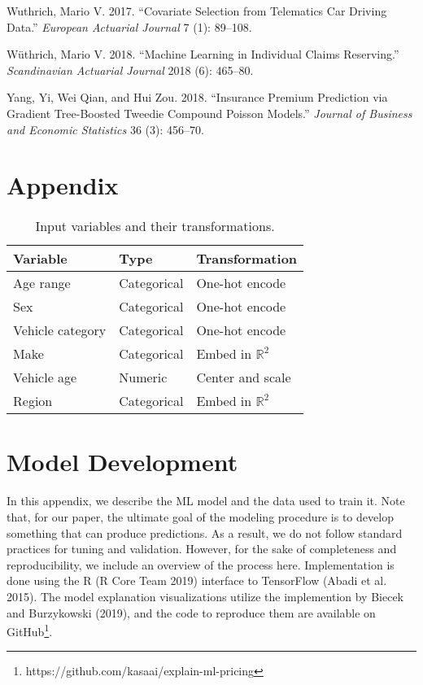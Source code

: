\documentclass[preprint, 3p, twocolumn, letterpaper, 10pt]{elsarticle} %
\begin{document}
\leavevmode\hypertarget{ref-wuthrich_2017}{}%
Wuthrich, Mario V. 2017. ``Covariate Selection from Telematics Car Driving Data.'' \emph{European Actuarial Journal} 7 (1): 89--108.

\leavevmode\hypertarget{ref-wuthrichMachineLearning2018}{}%
Wüthrich, Mario V. 2018. ``Machine Learning in Individual Claims Reserving.'' \emph{Scandinavian Actuarial Journal} 2018 (6): 465--80.

\leavevmode\hypertarget{ref-yang_2018}{}%
Yang, Yi, Wei Qian, and Hui Zou. 2018. ``Insurance Premium Prediction via Gradient Tree-Boosted Tweedie Compound Poisson Models.'' \emph{Journal of Business and Economic Statistics} 36 (3): 456--70.

\appendix

\hypertarget{appendix}{%
\section*{Appendix}\label{appendix}}

\begin{table}[!h]

\caption{\label{tab:variables}Input variables and their transformations.}
\centering
\begin{tabular}[t]{lll}
\toprule
Variable & Type & Transformation\\
\midrule
Age range & Categorical & One-hot encode\\
Sex & Categorical & One-hot encode\\
Vehicle category & Categorical & One-hot encode\\
Make & Categorical & Embed in $\mathbb{R}^2$\\
Vehicle age & Numeric & Center and scale\\
Region & Categorical & Embed in $\mathbb{R}^2$\\
\bottomrule
\end{tabular}
\end{table}

\hypertarget{model-dev}{%
\section{Model Development}\label{model-dev}}

In this appendix, we describe the ML model and the data used to train it. Note
that, for our paper, the ultimate goal of the modeling procedure is to develop
something that can produce predictions. As a result, we do not follow standard
practices for tuning and validation. However, for the sake of
completeness and reproducibility, we include an overview of the process here.
Implementation is done using the R (R Core Team 2019) interface to TensorFlow
(Abadi et al. 2015). The model explanation visualizations utilize the
implemention by Biecek and Burzykowski (2019), and the code to reproduce them are available on
GitHub\footnote{https://github.com/kasaai/explain-ml-pricing}.
\end{document}
